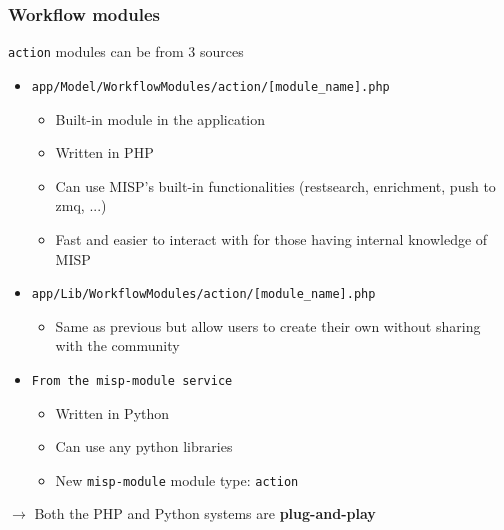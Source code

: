 \begin{frame}
    \frametitle{Workflow modules}
    \texttt{action} modules can be from 3 sources
    \begin{itemize}
        \item \texttt{\scriptsize app/Model/WorkflowModules/action/[module\_name].php}
        \begin{itemize}
            \item Built-in module in the application
            \item Written in PHP
            \item Can use MISP's built-in functionalities (restsearch, enrichment, push to zmq, ...)
            \item Fast and easier to interact with for those having internal knowledge of MISP
        \end{itemize}
        \item \texttt{\scriptsize app/Lib/WorkflowModules/action/[module\_name].php}
        \begin{itemize}
            \item Same as previous but allow users to create their own without sharing with the community
        \end{itemize}
        \item \texttt{From the misp-module service} 
        \begin{itemize}
            \item Written in Python
            \item Can use any python libraries
            \item New \texttt{misp-module} module type: \texttt{action}
        \end{itemize}
    \end{itemize}
    \begin{center}
        $\rightarrow$ Both the PHP and Python systems are \textbf{plug-and-play}
    \end{center}
\end{frame}

